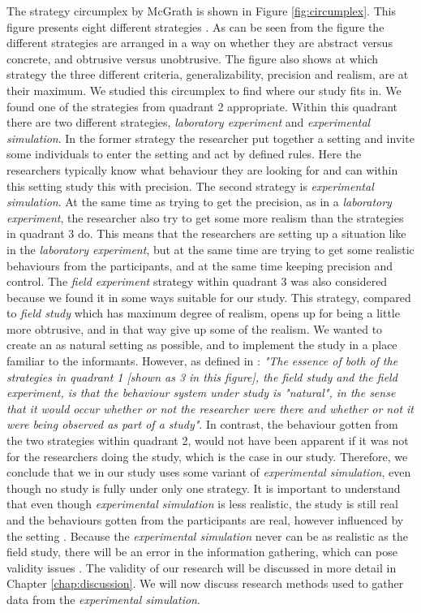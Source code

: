 The strategy circumplex by McGrath is shown in Figure \ref{fig:circumplex}. This figure presents eight different strategies \cite{McGrath}. As can be seen from the figure the different strategies are arranged in a way on whether they are abstract versus concrete, and obtrusive versus unobtrusive. The figure also shows at which strategy the three different criteria, generalizability, precision and realism, are at their maximum. We studied this circumplex to find where our study fits in. We found one of the strategies from quadrant 2 appropriate. Within this quadrant there are two different strategies, \emph{laboratory experiment} and \emph{experimental simulation}. In the former strategy the researcher put together a setting and invite some individuals to enter the setting and act by defined rules. Here the researchers typically know what behaviour they are looking for and can within this setting study this with precision. The second strategy is \emph{experimental simulation}. At the same time as trying to get the precision, as in a \emph{laboratory experiment}, the researcher also try to get some more realism than the strategies in quadrant 3 do. This means that the researchers are setting up a situation like in the \emph{laboratory experiment}, but at the same time are trying to get some realistic behaviours from the participants, and at the same time keeping precision and control. The \emph{field experiment} strategy within quadrant 3 was also considered because we found it in some ways suitable for our study. This strategy, compared to \emph{field study} which has maximum degree of realism, opens up for being a little more obtrusive, and in that way give up some of the realism. We wanted to create an as natural setting as possible, and to implement the study in a place familiar to the informants. However, as defined in \cite{McGrath}: \emph{"The essence of both of the strategies in quadrant 1 [shown as 3 in this figure], the field study and the field experiment, is that the behaviour system under study is "natural", in the sense that it would occur whether or not the researcher were there and whether or not it were being observed as part of a study"}. In contrast, the behaviour gotten from the two strategies within quadrant 2, would not have been apparent if it was not for the researchers doing the study, which is the case in our study. Therefore, we conclude that we in our study uses some variant of \emph{experimental simulation}, even though no study is fully under only one strategy. It is important to understand that even though \emph{experimental simulation} is less realistic, the study is still real and the behaviours gotten from the participants are real, however influenced by the setting \cite{McGrath}. Because the \emph{experimental simulation} never can be as realistic as the field study, there will be an error in the information gathering, which can pose validity issues \cite{alsos}. The validity of our research will be discussed in more detail in Chapter \ref{chap:discussion}. We will now discuss research methods used to gather data from the \emph{experimental simulation}. 

